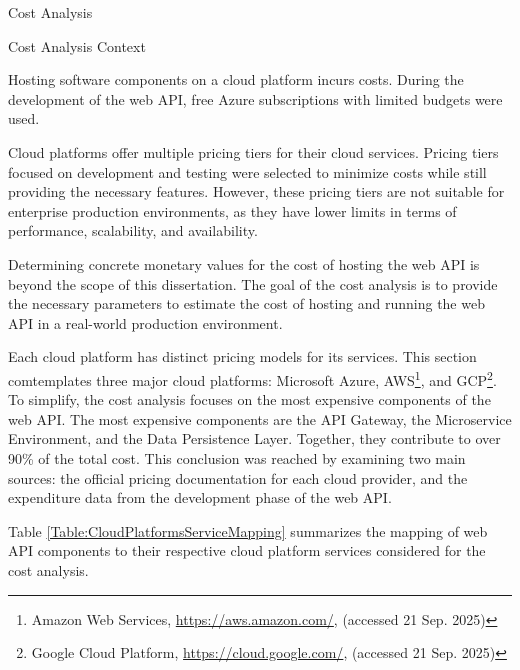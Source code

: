 \documentclass[12pt, reqno]{amsbook}
\makeatletter
\def\section{\@startsection{section}{1}%
      \z@{.5\linespacing\@plus.7\linespacing}{.25\linespacing}%
      {\normalfont\bfseries\flushleft}}
\def\subsection{\@startsection{subsection}{2}%
      \z@{.5\linespacing\@plus.7\linespacing}{.25\linespacing}%
      {\normalfont\bfseries\flushleft}}
\theoremstyle{definition}
\theoremstyle{definition}
\numberwithin{section}{chapter}
\numberwithin{table}{chapter}
\numberwithin{figure}{chapter}
\makeatother
\begin{document}
\section{Cost Analysis}
\label{Section:Cost_Analysis}

\subsection{Cost Analysis Context}
\label{Subsection:Cost_Analysis_Context}

Hosting software components on a cloud platform incurs costs. During the development of the web \ac{API}, free Azure subscriptions with limited budgets were used.

Cloud platforms offer multiple pricing tiers for their cloud services. Pricing tiers focused on development and testing were selected to minimize costs while still providing the necessary features. However, these pricing tiers are not suitable for enterprise production environments, as they have lower limits in terms of performance, scalability, and availability.

Determining concrete monetary values for the cost of hosting the web \ac{API} is beyond the scope of this dissertation. The goal of the cost analysis is to provide the necessary parameters to estimate the cost of hosting and running the web \ac{API} in a real-world production environment.

Each cloud platform has distinct pricing models for its services. This section comtemplates three major cloud platforms: Microsoft Azure, \ac{AWS}\footnote{Amazon Web Services, \url{https://aws.amazon.com/}, (accessed 21 Sep. 2025)}, and \ac{GCP}\footnote{Google Cloud Platform, \url{https://cloud.google.com/}, (accessed 21 Sep. 2025)}. To simplify, the cost analysis focuses on the most expensive components of the web \ac{API}. The most expensive components are the \ac{API} Gateway, the Microservice Environment, and the Data Persistence Layer. Together, they contribute to over 90\% of the total cost. This conclusion was reached by examining two main sources: the official pricing documentation for each cloud provider, and the expenditure data from the development phase of the web \ac{API}.

Table \ref{Table:CloudPlatformsServiceMapping} summarizes the mapping of web \ac{API} components to their respective cloud platform services considered for the cost analysis.
\end{document}
